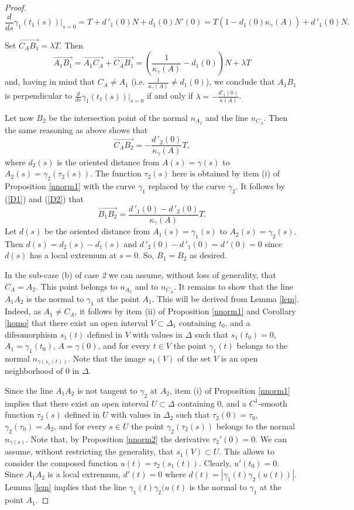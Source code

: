 \documentclass[10pt,a4paper]{amsart}
\def\g{\gamma}
\begin{document}
\begin{proof}
$$\frac{d}{ds}\g_1(t_1(s))|_{s=0}=
T+d\,'_1(0)N+d_1(0)N'(0)=T(1-d_1(0)\kappa_{\g}(A))+d\,'_1(0)N.$$

Set $\overrightarrow{C_AB_1} =\lambda T$. Then
$$ \overrightarrow{A_1B_1}= \overrightarrow{A_1C_A} +
\overrightarrow{C_AB_1}=
(\frac{1}{\kappa_{\g}(A)}-d_1(0))N+\lambda T$$ and, having in mind
that $C_A\neq A_1$ (i.e.
$\frac{1}{\kappa_{\g}(A)} \neq d_1(0)$), we conclude that $A_1B_1$ is perpendicular to
$\frac{d}{ds}\g_1(t_1(s))|_{s=0}$
if and only if $\lambda = -\frac{d'_1(0)}{\kappa(A)}$.

Let now $B_2$ be the intersection point of the normal $n_{A_2}$
and the line $n_{C_A}$. Then the same reasoning as above shows
that
\begin{equation}\label{D2}
\overrightarrow{C_AB_2} =-\frac{d\,'_2(0)}{\kappa_{\g}(A)}T ,
\end{equation}
where $d_2(s)$ is the oriented distance from $A(s)=\g(s)$ to
$A_2(s)=\g_2(\tau_2(s))$. The function
$\tau_2(s)$ here is obtained by item (i) of Proposition \ref{nnorm1} with the curve $\g_1$ replaced by the curve $\g_2$. It follows by (\ref{D1}) and (\ref{D2})
that
\begin{equation}\label{D3}
\overrightarrow{B_1B_2} =\frac{d\,'_1(0)-d\,'_2(0)}{\kappa_{\g}(A)}T.
\end{equation}
Let $d(s)$ be the oriented distance from $A_1(s)=\g_1(s)$ to
$A_2(s)=\g_2(s)$. Then $d(s)=d_2(s)-d_1(s)$ and
$d\,'_2(0)-d\,'_1(0)=d\,'(0)=0$ since $d(s)$ has a local extremum at
$s=0$. So, $B_1=B_2$ as desired.

In the sub-case (b) of case \emph{2} we can assume, without loss of generality, that $C_A= A_2$. This point belongs to
$n_{A_2}$ and to $n_{C_A}$. It remains to show that the line $A_1A_2$ is the normal to $\g_1$ at the point $A_1$. This will be derived from Lemma \ref{lem}. Indeed, as $A_1 \neq C_A$, it follows by item (ii) of Proposition \ref{nnorm1} and Corollary \ref{homo} that there exist an open interval
$V \subset \Delta_1$ containing $t_0$, and a  difeomorphism $s_1(t)$ defined in $V$ with values in
$\Delta$ such that $s_1(t_0) = 0$,
$A_1 =\g_1(t_0)$,
$A= \g(0)$, and for every
$t \in V$ the point $\g_1(t)$ belongs to the normal
 $n_{\g(s_1(t))}$. Note that the image $s_1(V)$ of the set $V$ is an open neighborhood of $0 $ in $\Delta$.

 Since the line $A_1A_2$ is not tangent to $\g_2$ at $A_2$, item (i) of Proposition \ref{nnorm1} implies that there exist an open interval $U \subset \Delta$ containing $0$, and a $C^1$-smooth function $\tau_2(s)$ defined in $ U$ with values in
$\Delta_2$ such that $\tau_2(0) = \tau_0$, $\g_2(\tau_0)=A_2$, and for every
$s \in U$ the point $\g_2(\tau_2(s))$ belongs to the normal $n_{\g(s)}$. Note that, by Proposition \ref{nnorm2} the derivative $\tau_2'(0) = 0$. We can assume, without restricting the generality, that
$s_1(V) \subset U$. This allows to consider the composed function $u(t) = \tau_2(s_1(t))$. Clearly, $u'(t_0) = 0$. Since $A_1A_2$ is a local extremum,
$d'(t)=0$ where $d(t)=|\g_1(t)\g_2(u(t))|$. Lemma \ref{lem} implies that the line $\g_1(t)\g_2(u(t)$ is the normal to $\g_1$ at the point $A_1$.



\end{proof}
\end{document}
